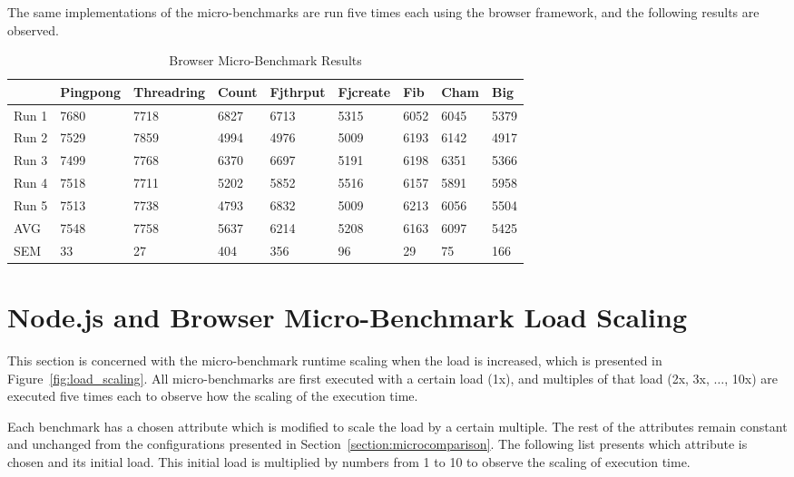 \documentclass[oneside]{um-fict}
\begin{document}
The same implementations of the micro-benchmarks are run five times each using the browser framework, and the following results are observed.
\begin{table}[H]
    \begin{center}
        \begin{tabular}{|l|llllllll|}
        \hline
            & Pingpong & Threadring & Count  & Fjthrput & Fjcreate & Fib    & Cham & Big    \\ \hline
        Run 1 & 7680     & 7718       & 6827   & 6713     & 5315     & 6052   & 6045      & 5379   \\
        Run 2 & 7529     & 7859       & 4994   & 4976     & 5009     & 6193   & 6142      & 4917   \\
        Run 3 & 7499     & 7768       & 6370   & 6697     & 5191     & 6198   & 6351      & 5366   \\
        Run 4 & 7518     & 7711       & 5202   & 5852     & 5516     & 6157   & 5891      & 5958   \\
        Run 5 & 7513     & 7738       & 4793   & 6832     & 5009     & 6213   & 6056      & 5504   \\ \hline
        AVG   & 7548   & 7758     & 5637 & 6214     & 5208     & 6163 & 6097      & 5425 \\
        SEM   & 33     & 27       & 404 & 356   & 96    & 29  & 75     & 166 \\ \hline
        \end{tabular}
        \caption{Browser Micro-Benchmark Results}\label{tab:browsermicro}
    \end{center}
\end{table}
\section{Node.js and Browser Micro-Benchmark Load Scaling}
This section is concerned with the micro-benchmark runtime scaling when the load is increased, which is presented in Figure~\ref{fig:load_scaling}. All micro-benchmarks are first executed with a certain load (1x), and multiples of that load (2x, 3x, $\ldots$, 10x) are executed five times each to observe how the scaling of the execution time.

Each benchmark has a chosen attribute which is modified to scale the load by a certain multiple. The rest of the attributes remain constant and unchanged from the configurations presented in Section~\ref{section:microcomparison}. The following list presents which attribute is chosen and its initial load. This initial load is multiplied by numbers from 1 to 10 to observe the scaling of execution time.
\end{document}
